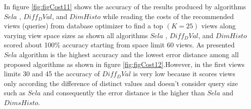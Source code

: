 In figure \ref{fig:figCost11} shows the accuracy of the results produced by
algorithms $Sela$ , $Diff_DVal$, and $DimHisto$ while reading the costs of the recommended views (queries) from database optimizer to find a top $(K=25)$ views
 along varying view space sizes as shown all algorithms $Sela$ , $Diff_DVal$, and $DimHisto$
  scored about 100\% accuracy starting from  space limit 60 views. 
 As 
presented $Sela$ algorithm is the highest accuracy 
and the lowest error distance among all 
proposed algorithms as shown in figure \ref{fig:figCost12}.However, 
in the first views limits 30 and 45 the accuracy of $Diff_DVal$ is very low because it scores views 
only according the difference of distinct values and doesn't consider query size such as $Sela$ %
and consequently the error distance is the higher than $Sela$ and $DimsHisto$.
 

